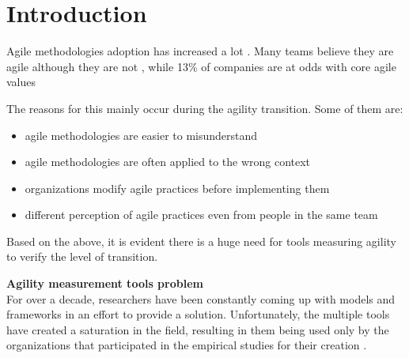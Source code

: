 \section{Introduction}
Agile methodologies adoption has increased a lot \cite{laurie_williams, Wang_Conboy, Salo_Abrahamsson}. Many teams believe they are agile although they are not \cite{ambysoft}, while 13\% of companies are at odds with core agile values \cite{versionOne}

The reasons for this mainly occur during the agility transition. Some of them are:

\begin{itemize}
	\item agile methodologies are easier to misunderstand \cite{6427226}
	\item agile methodologies are often applied to the wrong context \cite{cefam}
	\item organizations modify agile practices before implementing them \cite{1579312, 1629340}
	\item different perception of agile practices even from people in the same team \cite{ambler}
\end{itemize}

Based on the above, it is evident there is a huge need for tools measuring agility to verify the level of transition.

\textbf{Agility measurement tools problem} \\
For over a decade, researchers have been constantly coming up with models and frameworks in an effort to provide a solution. Unfortunately, the multiple tools have created a saturation in the field, resulting in them being used only by the organizations that participated in the empirical studies for their creation \cite{samireh_jalali_dissertation, jalali_angelis}.


\clearpage